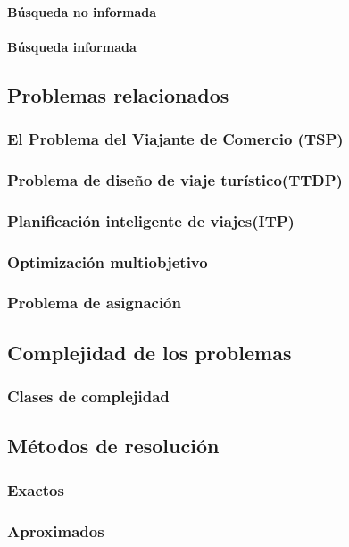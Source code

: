 \paragraph{Búsqueda no informada}
\paragraph{Búsqueda informada}

\subsection{Problemas relacionados}
\subsubsection{El Problema del Viajante de Comercio (TSP)}
\subsubsection{Problema de diseño de viaje turístico(TTDP)}
\subsubsection{Planificación inteligente de viajes(ITP)}
\subsubsection{Optimización multiobjetivo}
\subsubsection{Problema de asignación}

\subsection{Complejidad de los problemas}
\subsubsection{Clases de complejidad}

\subsection{Métodos de resolución}
\subsubsection{Exactos}
\subsubsection{Aproximados}

